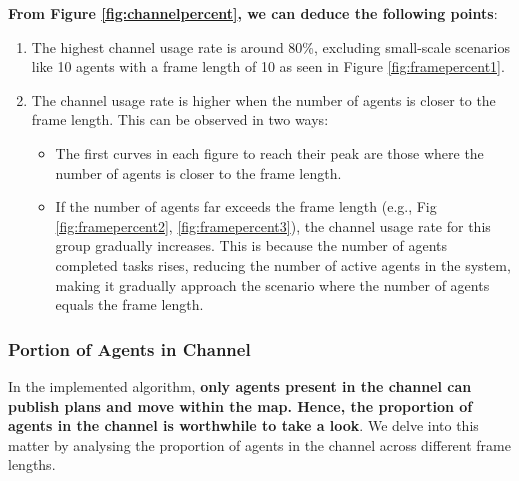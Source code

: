 \textbf{From Figure \ref{fig:channelpercent}, we can deduce the following points}:
\begin{enumerate}
    \item 
    The highest channel usage rate is around 80\%, excluding small-scale scenarios like 10 agents with a frame length of 10 as seen in Figure \ref{fig:framepercent1}.
    \item 
    The channel usage rate is higher when the number of agents is closer to the frame length. This can be observed in two ways:
    \begin{itemize}
        \item 
        The first curves in each figure to reach their peak are those where the number of agents is closer to the frame length.
        \item
        If the number of agents far exceeds the frame length (e.g., Fig \ref{fig:framepercent2}, \ref{fig:framepercent3}), the channel usage rate for this group gradually increases. This is because the number of agents completed tasks rises, reducing the number of active agents in the system, making it gradually approach the scenario where the number of agents equals the frame length.
    \end{itemize}
\end{enumerate}


\subsubsection{Portion of Agents in Channel}

In the implemented algorithm, \textbf{only agents present in the channel can publish plans and move within the map. Hence, the proportion of agents in the channel is worthwhile to take a look}.
We delve into this matter by analysing the proportion of agents in the channel across different frame lengths.

